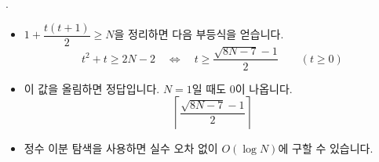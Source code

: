 \begin{frame}{\textbf{\pletter}. \ptitle}
    \begin{itemize}
        \item $1+\dfrac{t(t+1)}{2}\ge N$을 정리하면 다음 부등식을 얻습니다.
        \[
            t^2+t\ge 2N-2
            \quad\Longleftrightarrow\quad
            t\ge\frac{\sqrt{8N-7}-1}{2}\qquad (t\ge 0)
        \]
        \item 이 값을 올림하면 정답입니다. $N=1$일 때도 $0$이 나옵니다.
        \[
            \boxed{\left\lceil\frac{\sqrt{8N-7}-1}{2}\right\rceil}
        \]
        \item 정수 이분 탐색을 사용하면 실수 오차 없이 $O(\log N)$에 구할 수 있습니다.
    \end{itemize}
\end{frame}
